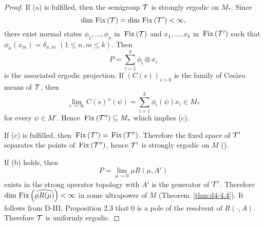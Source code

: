 \begin{proof}
If (a) is fulfilled, then the semigroup $ \mathcal{T} $  is strongly ergodic on $ M_{*} $.
Since
\[
\dim \mathop{}\mathrm{Fix}\left(\mathcal{T}\right) = \dim \mathop{}\mathrm{Fix}\left(\mathcal{T}'\right) < \infty,
\]
there exist normal states $ \phi_{1},\ldots,\phi_{n} $  in $ \mathop{}\mathrm{Fix}\left(\mathcal{T}\right) $  and $ x_{1},\ldots,x_{k} $  in $ \mathop{}\mathrm{Fix}\left(\mathcal{T}'\right) $  such that $ \phi_{n}(x_{m}) = \delta_{n,m} $  $ (1 \leq n, m \leq k) $.
Then 
\[
P = \sum_{i=1}^{k} \phi_{i} \otimes x_{i} 
\]
is the associated ergodic projection.
If $ (C(s))_{s>0} $  is the family of Cesàro means of $ \mathcal{T} $, then
\[
\lim_{s \to \infty} C(s)''(\psi) = \sum_{i=1}^{k} \phi_{i}(\psi)x_{i} \in M_{*}
\]
for every $ \psi \in M' $.
Hence $ \mathop{}\mathrm{Fix}\left(\mathcal{T}''\right) \subseteq M_{*} $  which implies (c).

If (c) is fulfilled, then $ \mathop{}\mathrm{Fix}\left(\mathcal{T}'\right) = \mathop{}\mathrm{Fix}\left(\mathcal{T}''\right) $.
Therefore the fixed space of $ \mathcal{T}' $  separates the points of $ \mathop{}\mathrm{Fix}\left(\mathcal{T}''\right) $, hence $ \mathcal{T}' $  is strongly ergodic on $ M $  (\citet[Chap.2, Thm.1.4]{krengel:1985}).

If (b) holds, then
\[
P = \lim_{\mu \to 0} \mu R(\mu,A')
\]
exists in the strong operator topology with $ A' $  is the generator of $ \mathcal{T}' $.
Therefore $ \dim \mathop{}\mathrm{Fix}\left(\widehat{\mu R(\mu)}\right) < \infty $  in some ultrapower of $ M $  (Theorem~\ref{thm:d4-4.4}).
It follows from D-III, Proposition 2.3 that 0 is a pole of the resolvent of $ R(\cdot,A) $.
Therefore $ \mathcal{T} $  is uniformly ergodic.
\end{proof}
